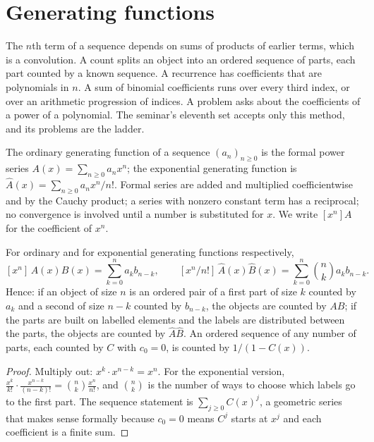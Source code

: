 \section{Generating functions}

\begin{recognise}
The $n$th term of a sequence depends on sums of products of earlier terms, which is a convolution. A count splits an object into an ordered sequence of parts, each part counted by a known sequence. A recurrence has coefficients that are polynomials in $n$. A sum of binomial coefficients runs over every third index, or over an arithmetic progression of indices. A problem asks about the coefficients of a power of a polynomial. The seminar's eleventh set accepts only this method, and its problems are the ladder.
\end{recognise}

\begin{definition}
The ordinary generating function of a sequence $(a_n)_{n\ge0}$ is the formal power series $A(x)=\sum_{n\ge0}a_nx^n$; the exponential generating function is $\hat A(x)=\sum_{n\ge0}a_nx^n/n!$. Formal series are added and multiplied coefficientwise and by the Cauchy product; a series with nonzero constant term has a reciprocal; no convergence is involved until a number is substituted for $x$. We write $[x^n]A$ for the coefficient of $x^n$.
\end{definition}

\begin{theorem}
For ordinary and for exponential generating functions respectively,
\[
[x^n]\,A(x)B(x)=\sum_{k=0}^na_kb_{n-k},\qquad [x^n/n!]\,\hat A(x)\hat B(x)=\sum_{k=0}^n\binom nka_kb_{n-k}.
\]
Hence: if an object of size $n$ is an ordered pair of a first part of size $k$ counted by $a_k$ and a second of size $n-k$ counted by $b_{n-k}$, the objects are counted by $AB$; if the parts are built on labelled elements and the labels are distributed between the parts, the objects are counted by $\hat A\hat B$. An ordered sequence of any number of parts, each counted by $C$ with $c_0=0$, is counted by $1/(1-C(x))$.
\end{theorem}

\begin{proof}
Multiply out: $x^k\cdot x^{n-k}=x^n$. For the exponential version, $\frac{x^k}{k!}\cdot\frac{x^{n-k}}{(n-k)!}=\binom nk\frac{x^n}{n!}$, and $\binom nk$ is the number of ways to choose which labels go to the first part. The sequence statement is $\sum_{j\ge0}C(x)^j$, a geometric series that makes sense formally because $c_0=0$ means $C^j$ starts at $x^j$ and each coefficient is a finite sum.
\end{proof}

